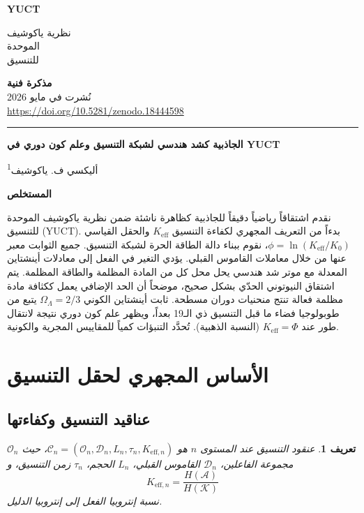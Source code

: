 \documentclass[12pt,a4paper]{article}
\newcommand{\Dir}{\mathcal{D}}
\newtheorem{definition}[theorem]{تعريف}
\newcommand{\makeheader}{%
	\noindent
	\begin{minipage}{0.17\textwidth}
		\raggedright
		{\sffamily\bfseries\color{skyblue}\fontsize{40}{40}\selectfont YUCT}%
	\end{minipage}%
	\hspace{30pt}
	\begin{minipage}{0.32\textwidth}
		\raggedright
		{\sffamily\fontsize{11}{13}\selectfont نظرية ياكوشيف\\ الموحدة\\ للتنسيق}%
	\end{minipage}%
	\hfill
	\begin{minipage}{0.38\textwidth}
		\raggedleft
		{\sffamily\bfseries مذكرة فنية}\\
		{\sffamily نُشرت في مايو 2026}\\
		{\sffamily\footnotesize \scriptsize\url{https://doi.org/10.5281/zenodo.18444598}}%
	\end{minipage}
	\par\vspace{5pt}
	\noindent\textcolor{gold}{\rule{\textwidth}{1.6pt}}
	\par\vspace{0pt}
}
\begin{document}
	\thispagestyle{firstpage}
	\makeheader
	
	\vspace{0cm}
	{\LARGE\bfseries الجاذبية كشد هندسي لشبكة التنسيق وعلم كون دوري في YUCT \par}
	\vspace{0.2cm}
	
	{\large أليكسي ف. ياكوشيف\textsuperscript{1}} \\
	\vspace{0.0cm}
	
	{\color{darkblue}\textbf{\LARGE المستخلص}} \par
	
	نقدم اشتقاقاً رياضياً دقيقاً للجاذبية كظاهرة ناشئة ضمن نظرية ياكوشيف الموحدة للتنسيق (YUCT). بدءاً من التعريف المجهري لكفاءة التنسيق \(K_{\mathrm{eff}}\) والحقل القياسي \(\phi = \ln (K_{\mathrm{eff}}/K_0)\)، نقوم ببناء دالة الطاقة الحرة لشبكة التنسيق. جميع الثوابت معبر عنها من خلال معاملات القاموس القبلي. يؤدي التغير في الفعل إلى معادلات أينشتاين المعدلة مع موتر شد هندسي يحل محل كل من المادة المظلمة والطاقة المظلمة. يتم اشتقاق النيوتوني الحدّي بشكل صحيح، موضحاً أن الحد الإضافي يعمل ككثافة مادة مظلمة فعالة تنتج منحنيات دوران مسطحة. ثابت أينشتاين الكوني \(\Omega_\Lambda = 2/3\) يتبع من طوبولوجيا فضاء ما قبل التنسيق ذي الـ19 بعداً، ويظهر علم كون دوري نتيجة لانتقال طور عند \(K_{\mathrm{eff}} = \Phi\) (النسبة الذهبية). تُحدَّد التنبؤات كمياً للمقاييس المجرية والكونية.
	\clearpage
	\tableofcontents
	
	\section{الأساس المجهري لحقل التنسيق}
	
	\subsection{عناقيد التنسيق وكفاءتها}
	\begin{definition}
		عنقود التنسيق عند المستوى \(n\) هو \(\mathcal{C}_n = (\mathcal{O}_n, \Dir_n, L_n, \tau_n, K_{\mathrm{eff},n})\)، حيث \(\mathcal{O}_n\) مجموعة الفاعلين، \(\Dir_n\) القاموس القبلي، \(L_n\) الحجم، \(\tau_n\) زمن التنسيق، و
		\[
		K_{\mathrm{eff},n} = \frac{H(\mathcal{A})}{H(\mathcal{K})}
		\]
		نسبة إنتروبيا الفعل إلى إنتروبيا الدليل.
	\end{definition}
	
\end{document}
